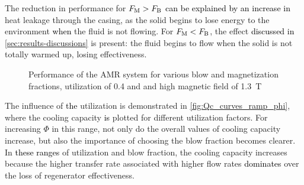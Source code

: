 \documentclass[referee]{svjour3}
\begin{document}
The reduction in performance for $F_{\mathrm{M}} > F_{\mathrm{B}}$ \textcolor{black}{can be explained by an increase in} heat leakage through the casing, as the solid begins to lose energy to the environment \textcolor{black}{when} the fluid is not flowing. For $F_{\mathrm{M}} < F_{\mathrm{B}}$, the effect \textcolor{black}{discussed in} \autoref{sec:results-discussions} is present: the fluid begins to flow when the solid is not totally warmed up, losing effectiveness.

\begin{figure}[!ht]
  \centering
\quad
  \caption{Performance of the AMR system for various blow and magnetization fractions, utilization of 0.4 and and high magnetic field of \SI{1.3}{\tesla}}
  \label{fig:Qc_COP_curves_phi40}
\end{figure}

The influence of \textcolor{black}{the} utilization is demonstrated in \autoref{fig:Qc_curves_ramp_phi}, where the cooling capacity \textcolor{black}{is} plotted for different utilization factors. For increasing $\Phi$ in this range, not only do the overall values of cooling capacity increase, but also the importance of choosing the blow fraction becomes clearer. In \textcolor{black}{these ranges} of utilization and blow fraction,  the cooling capacity increases because the higher transfer rate associated with higher flow rates \textcolor{black}{dominates} over the loss of regenerator effectiveness.
\end{document}

